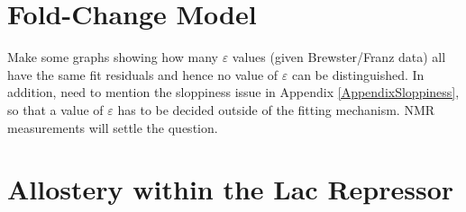 \appendix

\section{Fold-Change Model} \label{AppendixModel}


Make some graphs showing how many $\varepsilon$ values (given Brewster/Franz data)
all have the same fit residuals and hence no value of $\varepsilon$ can be
distinguished. In addition, need to mention the sloppiness issue in Appendix \ref{AppendixSloppiness}, so that a value of $\varepsilon$ has to be decided outside of the fitting mechanism. NMR measurements will settle the question.

\section{Allostery within the Lac Repressor} \label{AppendixAllostery}

